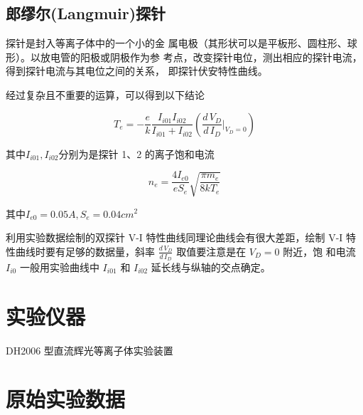 \documentclass[a4paper,UTF8]{ctexart}
\begin{document}
\subsection{郎缪尔(Langmuir)探针}

探针是封入等离子体中的一个小的金
属电极（其形状可以是平板形、圆柱形、球形）。以放电管的阳极或阴极作为参
考点，改变探针电位，测出相应的探针电流，得到探针电流与其电位之间的关系，
即探针伏安特性曲线。

经过复杂且不重要的运算，可以得到以下结论

\begin{equation}
    T_e = -\frac{e}{k} \frac{I_{i01}I_{i02}}{I_{i01}+I_{i02}} (\frac{d\,V_D}{d\,I_D}\bigg|_{V_D = 0})
\end{equation}

其中$I_{i01},I_{i02}$分别为是探针 1、2 的离子饱和电流

\begin{equation}
    n_e = \frac{4I_{e0}}{eS_e} \sqrt{\frac{\pi m_e}{8k T_e}}
\end{equation}

其中$I_{e0} = 0.05A,S_e = 0.04cm^2$

利用实验数据绘制的双探针 V-I 特性曲线同理论曲线会有很大差距，绘制
V-I 特性曲线时要有足够的数据量，斜率 $\frac{d\,V_{D}}{d\,I_{D}}$ 取值要注意是在 $V_D = 0$ 附近，饱
和电流 $I_{i0}$ 一般用实验曲线中 $I_{i01}$ 和 $I_{i02}$ 延长线与纵轴的交点确定。

\section{实验仪器}

DH2006 型直流辉光等离子体实验装置

\section{原始实验数据}
\end{document}

